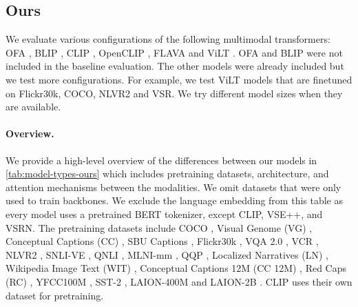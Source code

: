 \subsection{Ours}
We evaluate various configurations of the following multimodal transformers: OFA \cite{wang2022unifying}, BLIP \cite{li2022blip}, CLIP \cite{radford2021clip}, OpenCLIP \cite{ilharco_gabriel_2021_5143773}, FLAVA \cite{singh2022flava} and ViLT \cite{kim2021vilt}. OFA and BLIP were not included in the baseline evaluation. The other models were already included but we test more configurations. For example, we test ViLT models that are finetuned on Flickr30k, COCO, NLVR2 and VSR. We try different model sizes when they are available.

\paragraph{Overview.}
We provide a high-level overview of the differences between our models in \cref{tab:model-types-ours} which includes pretraining datasets, architecture, and attention mechanisms between the modalities. We omit datasets that were only used to train backbones. We exclude the language embedding from this table as every model uses a pretrained BERT tokenizer, except CLIP, VSE++, and VSRN. The pretraining datasets include COCO \cite{lin2014microsoft}, Visual Genome (VG) \cite{krishna2016visual}, Conceptual Captions (CC) \cite{sharma2018conceptual}, SBU Captions \cite{ordonez2011im2text}, Flickr30k \cite{young2014image}, VQA 2.0 \cite{goyal2017making}, VCR \cite{zellers2019recognition}, NLVR2 \cite{suhr2017corpus}, SNLI-VE \cite{xie2018visual}, QNLI \cite{rajpurkar2016squad}, MLNI-mm \cite{williams2017broad}, QQP \cite{QQPDataset}, Localized Narratives (LN) \cite{pont-tuset2020localized-narratives}, Wikipedia Image Text (WIT) \cite{srinivasan2021wit}, Conceptual Captions 12M (CC 12M) \cite{changpinyo2021conceptual12m}, Red Caps (RC) \cite{desai2021redcaps}, YFCC100M \cite{thomee2016yfcc100m}, SST-2 \cite{Socher2013RecursiveDM}, LAION-400M \cite{schuhmann2021laion} and LAION-2B \cite{schuhmann2022laionb}. CLIP uses their own dataset for pretraining.

